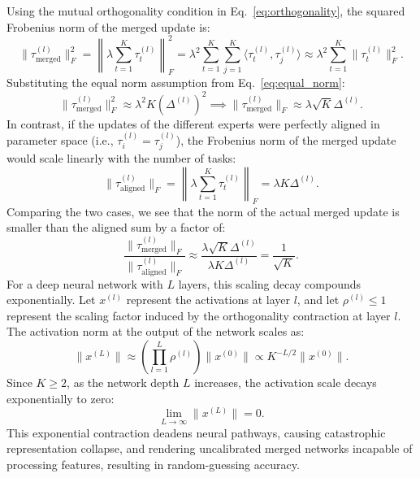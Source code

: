 \documentclass{article}
\theoremstyle{plain}
\theoremstyle{definition}
\theoremstyle{remark}
\begin{document}
Using the mutual orthogonality condition in Eq.~\eqref{eq:orthogonality}, the squared Frobenius norm of the merged update is:
\begin{equation}
    \|\tau_{\text{merged}}^{(l)}\|_F^2 = \left\| \lambda \sum_{t=1}^K \tau_t^{(l)} \right\|_F^2 = \lambda^2 \sum_{t=1}^K \sum_{j=1}^K \langle \tau_t^{(l)}, \tau_j^{(l)} \rangle \approx \lambda^2 \sum_{t=1}^K \|\tau_t^{(l)}\|_F^2.
\end{equation}
Substituting the equal norm assumption from Eq.~\eqref{eq:equal_norm}:
\begin{equation}
    \|\tau_{\text{merged}}^{(l)}\|_F^2 \approx \lambda^2 K (\Delta^{(l)})^2 \implies \|\tau_{\text{merged}}^{(l)}\|_F \approx \lambda \sqrt{K} \Delta^{(l)}.
\end{equation}
In contrast, if the updates of the different experts were perfectly aligned in parameter space (i.e., $\tau_i^{(l)} = \tau_j^{(l)}$), the Frobenius norm of the merged update would scale linearly with the number of tasks:
\begin{equation}
    \|\tau_{\text{aligned}}^{(l)}\|_F = \left\| \lambda \sum_{t=1}^K \tau_t^{(l)} \right\|_F = \lambda K \Delta^{(l)}.
\end{equation}
Comparing the two cases, we see that the norm of the actual merged update is smaller than the aligned sum by a factor of:
\begin{equation}
    \frac{\|\tau_{\text{merged}}^{(l)}\|_F}{\|\tau_{\text{aligned}}^{(l)}\|_F} \approx \frac{\lambda \sqrt{K} \Delta^{(l)}}{\lambda K \Delta^{(l)}} = \frac{1}{\sqrt{K}}.
\end{equation}
For a deep neural network with $L$ layers, this scaling decay compounds exponentially. Let $x^{(l)}$ represent the activations at layer $l$, and let $\rho^{(l)} \le 1$ represent the scaling factor induced by the orthogonality contraction at layer $l$. The activation norm at the output of the network scales as:
\begin{equation}
    \|x^{(L)}\| \approx \left(\prod_{l=1}^L \rho^{(l)}\right) \|x^{(0)}\| \propto K^{-L/2} \|x^{(0)}\|.
\end{equation}
Since $K \ge 2$, as the network depth $L$ increases, the activation scale decays exponentially to zero:
\begin{equation}
    \lim_{L \to \infty} \|x^{(L)}\| = 0.
\end{equation}
This exponential contraction deadens neural pathways, causing catastrophic representation collapse, and rendering uncalibrated merged networks incapable of processing features, resulting in random-guessing accuracy.
\end{document}
